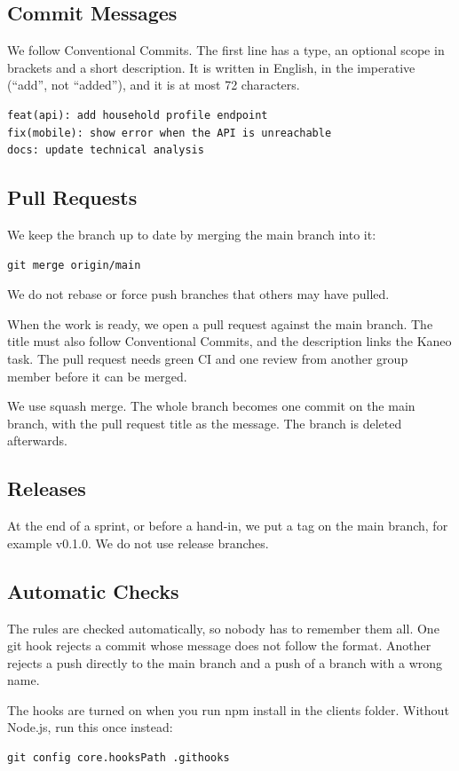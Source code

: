 \documentclass[a4paper,11pt]{article}
\begin{document}
\subsection{Commit Messages}
We follow Conventional Commits. The first line has a type, an optional scope in brackets and a short description. It is written in English, in the imperative (``add'', not ``added''), and it is at most 72 characters.
\begin{lstlisting}
feat(api): add household profile endpoint
fix(mobile): show error when the API is unreachable
docs: update technical analysis
\end{lstlisting}

\subsection{Pull Requests}
We keep the branch up to date by merging the main branch into it:
\begin{lstlisting}
git merge origin/main
\end{lstlisting}
We do not rebase or force push branches that others may have pulled.

When the work is ready, we open a pull request against the main branch. The title must also follow Conventional Commits, and the description links the Kaneo task. The pull request needs green CI and one review from another group member before it can be merged.

We use squash merge. The whole branch becomes one commit on the main branch, with the pull request title as the message. The branch is deleted afterwards.

\subsection{Releases}
At the end of a sprint, or before a hand-in, we put a tag on the main branch, for example v0.1.0. We do not use release branches.

\subsection{Automatic Checks}
The rules are checked automatically, so nobody has to remember them all. One git hook rejects a commit whose message does not follow the format. Another rejects a push directly to the main branch and a push of a branch with a wrong name.

The hooks are turned on when you run npm install in the clients folder. Without Node.js, run this once instead:
\begin{lstlisting}
git config core.hooksPath .githooks
\end{lstlisting}
\end{document}
